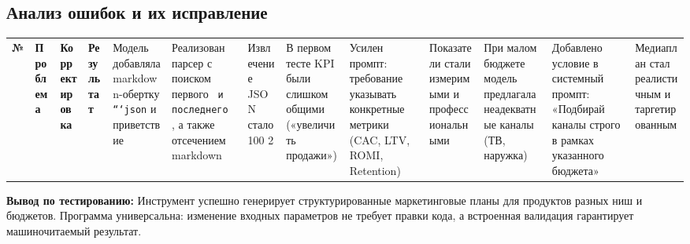 \documentclass[oneside,a4paper,14pt]{extarticle}
\begin{document}
	\subsection{Анализ ошибок и их исправление}
	\begin{table}[H]
	\centering
	\begin{tabular}{|l|p{5cm}|p{4.5cm}|p{4cm}|}
		\hline
		\textbf{№} & \textbf{Проблема} & \textbf{Корректировка} & \textbf{Результат} \  & Модель добавляла markdown-обертку \texttt{```json} и приветствие & Реализован парсер с поиском первого \texttt{{} и последнего \texttt{}}, а также отсечением markdown & Извлечение JSON стало 100%
		2 & В первом тесте KPI были слишком общими («увеличить продажи») & Усилен промпт: требование указывать конкретные метрики (CAC, LTV, ROMI, Retention) & Показатели стали измеримыми и профессиональными \  & При малом бюджете модель предлагала неадекватные каналы (ТВ, наружка) & Добавлено условие в системный промпт: «Подбирай каналы строго в рамках указанного бюджета» & Медиаплан стал реалистичным и таргетированным \ \hline
	\end{tabular}
	\end{table}
	\noindent
	\textbf{Вывод по тестированию:} Инструмент успешно генерирует структурированные маркетинговые планы для продуктов разных ниш и бюджетов. Программа универсальна: изменение входных параметров не требует правки кода, а встроенная валидация гарантирует машиночитаемый результат.
	\newpage
\end{document}
